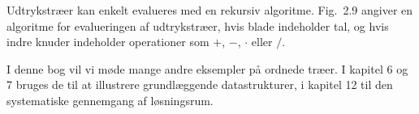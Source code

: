 Udtrykstræer kan enkelt evalueres med en rekursiv algoritme.
Fig.~2.9 angiver en algoritme for evalueringen af udtrykstræer, hvis blade indeholder tal, og hvis indre knuder indeholder operationer som $+$, $-$, $\cdot$ eller $/$.

I denne bog vil vi møde mange andre eksempler på ordnede træer.
I kapitel 6 og 7 bruges de til at illustrere grundlæggende datastrukturer, i kapitel 12 til den systematiske gennemgang af løsningsrum.
